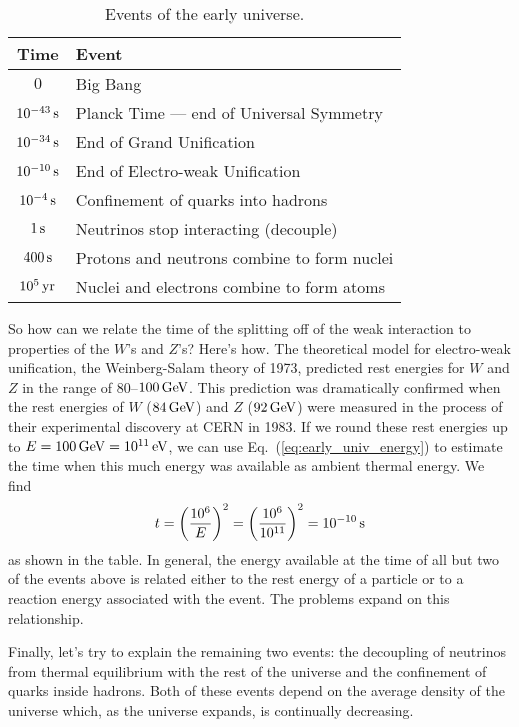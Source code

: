 \begin{table}[tbp]
\caption{Events of the early universe.}
\label{table:early_universe}
\begin{center}
\begin{tabular}[tbp]{cl}
Time & Event \\
\hline\hline
$0$          & Big Bang \\
$10^{-43}\,\mbox{s}$ & Planck Time --- end of Universal Symmetry\\
$10^{-34}\,\mbox{s}$ & End of Grand Unification\\
$10^{-10}\,\mbox{s}$ & End of Electro-weak Unification\\
$10^{-4}\,\mbox{s}$  & Confinement of quarks into hadrons\\
$1\,\mbox{s}$        & Neutrinos stop interacting (decouple)\\
$400\,\mbox{s}$      & Protons and neutrons combine to form nuclei\\
$10^5\,\mbox{yr}$    & Nuclei and electrons combine to form atoms\\
\hline
\end{tabular}
\end{center}
\end{table}


So how can we relate the time of the splitting off of the weak
interaction to properties of the $W$'s and $Z$'s?  Here's how. The
theoretical model for electro-weak unification, the Weinberg-Salam
theory of 1973, predicted rest energies for $W$ and $Z$ in the range
of 80--$100\,\mbox{GeV}$.  This prediction was dramatically confirmed when the
rest energies of $W$ ($84\,\mbox{GeV}$) and $Z$ ($92\,\mbox{GeV}$) were 
measured in the
process of their experimental discovery at CERN in 1983.  If we round
these rest energies up to $E=100\,\mbox{GeV}=10^{11}\,\mbox{eV}$, we can use
Eq.~(\ref{eq:early_univ_energy}) to estimate the time when this much
energy was available as ambient thermal energy.  We find
\begin{equation}
t = \left(\frac{10^6}{E}\right)^2 = \left(\frac{10^6}{10^{11}}\right)^2 
   = 10^{-10}\,\mbox{s}
\end{equation}
as shown in the table. In general, the energy available at the time of
all but two of the events above is related either to the rest energy
of a particle or to a reaction energy associated with the event.  The
problems expand on this relationship.

Finally, let's try to explain the remaining two events: the decoupling
of neutrinos from thermal equilibrium with the rest of the universe
and the confinement of quarks inside hadrons.  Both of these events
depend on the average density of the universe which, as the universe
expands, is continually decreasing.

